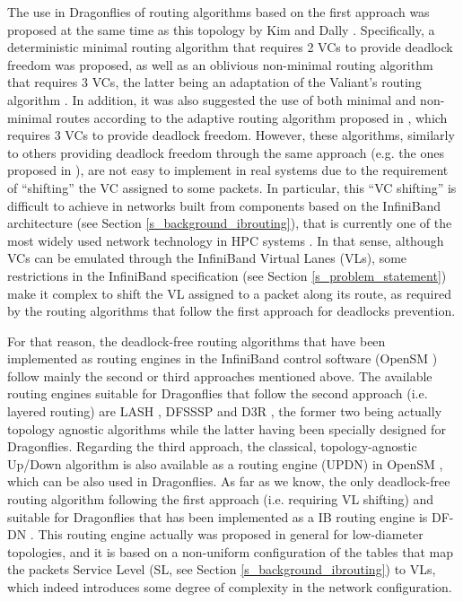 \documentclass[review]{elsarticle}
\newcommand{\dflys}{Dragonflies}
\newcommand{\ib}{IB}
\newcommand{\ibl}{InfiniBand}
\begin{document}
The use in \dflys{} of routing algorithms based on the first approach was proposed at the same time as this topology by Kim and Dally \cite{kim_technology-driven_2008}.
Specifically, a deterministic minimal routing algorithm that requires 2 VCs to provide deadlock freedom was proposed, as well as an oblivious
non-minimal routing algorithm that requires 3 VCs, the latter being an adaptation of the Valiant's routing algorithm \cite{valiant_1981}.
In addition, it was also suggested the use of both minimal and non-minimal routes according to the adaptive routing algorithm proposed in \cite{kim_technology-driven_2008, singh-thesis2005},
which requires 3 VCs to provide deadlock freedom.
However, these algorithms, similarly to others providing deadlock freedom through the same approach (e.g. the ones proposed in \cite{mgarcia-icpp13, faizian-hoti16, won2015}),
are not easy to implement in real systems due to the requirement of ``shifting'' the VC assigned to some packets.
In particular, this ``VC shifting'' is difficult to achieve in networks built from components based on the InfiniBand architecture \cite{IBA2015} (see Section \ref{s_background_ibrouting}),
that is currently one of the most widely used network technology in HPC systems \cite{top500_list}.
In that sense, although VCs can be emulated through the InfiniBand Virtual Lanes (VLs), some restrictions in the InfiniBand specification  \cite{IBA2015}
(see Section \ref{s_problem_statement}) make it complex to shift the VL assigned to a packet along its route, as required by the routing algorithms that follow the first approach for deadlocks prevention.

For that reason, the deadlock-free routing algorithms that have been implemented as routing engines in the \ibl{} control software (OpenSM \cite{opensm}) follow mainly the second or third approaches mentioned above.
The available routing engines suitable for \dflys{} that follow the second approach (i.e. layered routing) are LASH \citep{skeie2002_lash}, DFSSSP \cite{domke2011_dfsssp} and D3R \cite{maglione2018_d3r},
the former two being actually topology agnostic algorithms while the latter having been specially designed for \dflys{}.
Regarding the third approach, the classical, topology-agnostic Up/Down algorithm is also available as a routing engine (UPDN) in OpenSM \cite{sancho2001_updn}, which can be also used in \dflys{}.
As far as we know, the only deadlock-free routing algorithm following the first approach (i.e. requiring VL shifting) and suitable for \dflys{} that has been implemented as a \ib{} routing engine is DF-DN \cite{schneider2016_dfdn}.
This routing engine actually was proposed in general for low-diameter topologies, and it is based on a non-uniform configuration of the tables that map the packets
Service Level (SL, see Section \ref{s_background_ibrouting}) to VLs, which indeed introduces some degree of complexity in the network configuration.
\end{document}
